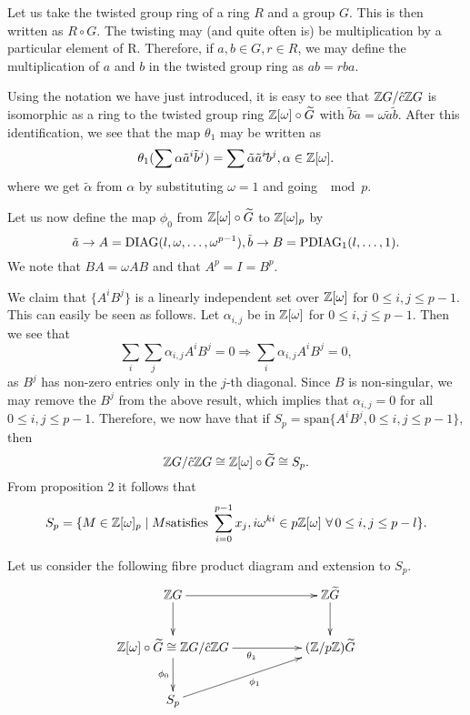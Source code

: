 \documentclass[11pt]{report}
\begin{document}
Let us take the twisted group ring of a ring $R$ and a group $G$. 
This is then written as
$R\circ{}G$. The twisting may (and quite often is) be multiplication by a 
particular element of R.
Therefore, if $a,b \in G, r \in R$, we may define the 
multiplication of $a$ and $b$ in the
twisted group ring as $ab = rba$.

Using the notation we have just introduced, it is easy to see 
that $ \mathbb{Z}{}G/\hat{c} \mathbb{Z}{}G$ is
isomorphic as a ring to the twisted group ring $ \mathbb{Z}{}[\omega]\circ\widetilde{G}$ with
$ \tilde{b}\tilde{a} = \omega\tilde{a}\tilde{b}$. After this
identification, we see that the map $\theta_1$ may be written as
\[\theta_1(\sum\alpha\tilde{a}^i\tilde{b}^j) = \sum\tilde{\alpha}\tilde{a}^i\tilde{}b^j, \alpha \in  \mathbb{Z}{}[\omega].\]
where we get $\tilde{\alpha}$ from $\alpha$ by substituting $\omega = 1$ and going $\mod{p}$.

Let us now define the map $\phi_0$ from $ \mathbb{Z}{}[\omega]\circ\widetilde{G}$
to $ \mathbb{Z}{}[\omega]_p$ by
\begin{equation*}
\tilde{a}\rightarrow A = \mathrm{DIAG}(l,\omega,\ldots,\omega^{p-1}),\\
\tilde{b} \rightarrow B = \mathrm{PDIAG}_1(l,\ldots,1).\\
\end{equation*}
We note that $BA = \omega{}AB$ and that $A^p = I = B^p$.

We claim that $\{A^iB^j\}$ is a linearly independent set over $ \mathbb{Z}{}[\omega]$
for $0\le{}i,j\le{}p-1$. This
can easily be seen as follows. Let $\alpha_{i,j}$ be in $ \mathbb{Z}{}[\omega]$ for 
$0\le{}i,j\le{}p-1$. Then 
we see that %
\[\sum_i\sum_j\alpha_{i,j}A^iB^j = 0 \Longrightarrow \sum_i\alpha_{i,j}A^iB^j = 0,\]
as $B^j$ has non-zero entries only in the $j$-th diagonal. Since $B$ 
is non-singular, we may remove
the $B^j$ from the above result, which implies that   $\alpha_{i,j}= 0$ for all 
$0\le{}i,j\le{}p-1$. Therefore, we now
have that if $S_p = \mathrm{span}\{A^iB^j, 0\le{}i,j\le{}p-1\},$ then
\[ \mathbb{Z}{}G/\hat{c} \mathbb{Z}{}G \cong  \mathbb{Z}{}[\omega]\circ\widetilde{G}
\cong S_p.\]
From proposition 2 it follows that
\[S_p = \{M\in\iom_p \mid M \mathrm{satisfies }\ \sum_{i=0}^{p-1}
x_j,i\omega^{ki} \in p\iom\ \forall\, 0\le i,j\le p-l\}.
\]

Let us consider the following fibre product diagram and extension 
to $S_p$.
\[
\xymatrix{
\intG \ar[rr] \ar[d] &&\intGtil \ar[d]\\
\iom\circ\widetilde{G}\cong\intG/\hat{c}\intG \ar[rr]_{\theta_1} \ar[d]_{\phi_0}&&
    (\integers/p\integers)\widetilde{G}\\
S_p \ar[urr]_{\phi_1}\\
}
\]
\end{document}
